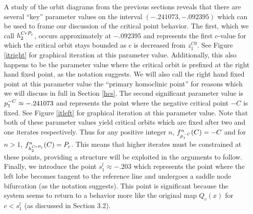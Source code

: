 A study of the orbit diagrams from the previous sections reveals that there are several ``key'' parameter values on the interval $ (-.241073, -.092395)$ which can be used to frame our discussion of the critical point behavior. The first, which we call $h^{CrP_c}_2$, occurs approximately at $-.092395$ and represents the first $c$-value for which the critical orbit stays bounded as $c$ is decreased from $z_1^{C0}$. See Figure \ref{itright} for graphical iteration at this parameter value. Additionally, this also happens to be the parameter value where the critical orbit is prefixed at the right hand fixed point, as the notation suggests. We will also call the right hand fixed point at this parameter value the ``primary homoclinic point'' for reasons which we will discuss in full in Section \ref{hcs}. The second significant parameter value is $p^{-C}_1 \approx -.241073$ and represents the point where the negative critical point $-C$ is fixed. See Figure \ref{itleft} for graphical iteration at this parameter value. Note that both of these parameter values yield critical orbits which are fixed after two and one iterates respectively. Thus for any positive integer $n$, $f^n_{p^{-C}_1} (C) = -C$ and for $n > 1$, $f^n_{h^{CrP_c}_2} (C) = P_c$. This means that higher iterates must be constrained at these points, providing a structure will be exploited in the arguments to follow. Finally, we introduce the point $s_1^l \approx -.203$ which represents the point where the left lobe becomes tangent to the reference line and undergoes a saddle node bifurcation (as the notation suggests). This point is significant because the system seems to return to a behavior more like the original map $Q_c (x)$ for $c < s_1^l$ (as discussed in Section 3.2).


	

	